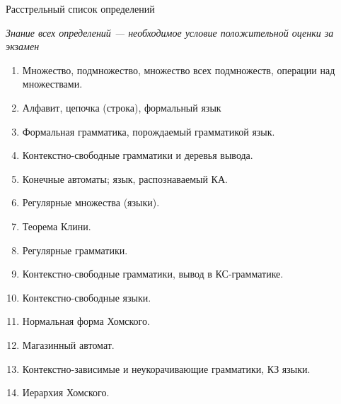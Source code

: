 \documentclass[12pt]{article}
\newcommand{\litem}[1]{\item #1 }%
\begin{document}
\newpage

\begin{center}
{\LARGE Расстрельный список определений}

{\emph{ Знание всех определений --- необходимое условие положительной оценки за экзамен }}
\end{center}


\bigskip
\begin{enumerate}
  \litem {Множество, подмножество, множество всех подмножеств, операции над множествами.}
  \litem {Алфавит, цепочка (строка), формальный язык} 
  \litem {Формальная грамматика, порождаемый грамматикой язык.}
  \litem {Контекстно-свободные грамматики и деревья вывода.}
  \litem {Конечные автоматы; язык, распознаваемый КА. }
  \litem {Регулярные множества (языки). }
  \litem {Теорема Клини.}
  \litem {Регулярные грамматики.}
  \litem {Контекстно-свободные грамматики, вывод в КС-грамматике.}
  \litem {Контекстно-свободные языки.}
  \litem {Нормальная форма Хомского.}
  \litem {Магазинный автомат.}
  \litem {Контекстно-зависимые и неукорачивающие грамматики, КЗ языки.}
  \litem {Иерархия Хомского.}
\end{enumerate}
\end{document}
